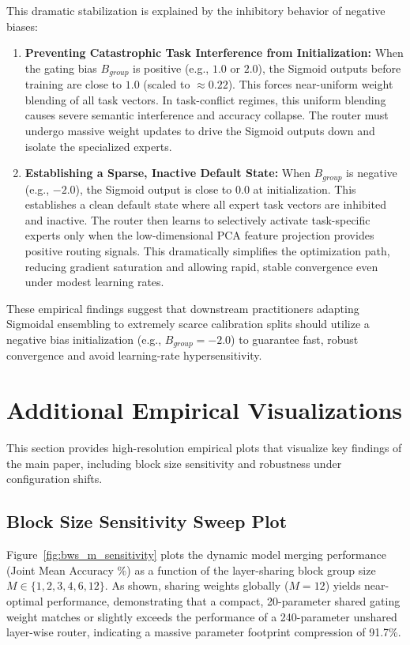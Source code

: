 This dramatic stabilization is explained by the inhibitory behavior of negative biases:
\begin{enumerate}
    \item \textbf{Preventing Catastrophic Task Interference from Initialization:} When the gating bias $B_{group}$ is positive (e.g., $1.0$ or $2.0$), the Sigmoid outputs before training are close to $1.0$ (scaled to $\approx 0.22$). This forces near-uniform weight blending of all task vectors. In task-conflict regimes, this uniform blending causes severe semantic interference and accuracy collapse. The router must undergo massive weight updates to drive the Sigmoid outputs down and isolate the specialized experts. 
    \item \textbf{Establishing a Sparse, Inactive Default State:} When $B_{group}$ is negative (e.g., $-2.0$), the Sigmoid output is close to $0.0$ at initialization. This establishes a clean default state where all expert task vectors are inhibited and inactive. The router then learns to selectively activate task-specific experts only when the low-dimensional PCA feature projection provides positive routing signals. This dramatically simplifies the optimization path, reducing gradient saturation and allowing rapid, stable convergence even under modest learning rates.
\end{enumerate}

These empirical findings suggest that downstream practitioners adapting Sigmoidal ensembling to extremely scarce calibration splits should utilize a negative bias initialization (e.g., $B_{group} = -2.0$) to guarantee fast, robust convergence and avoid learning-rate hypersensitivity.

\section{Additional Empirical Visualizations}
\label{app:additional_plots}
This section provides high-resolution empirical plots that visualize key findings of the main paper, including block size sensitivity and robustness under configuration shifts.

\subsection{Block Size Sensitivity Sweep Plot}
Figure~\ref{fig:bws_m_sensitivity} plots the dynamic model merging performance (Joint Mean Accuracy \%) as a function of the layer-sharing block group size $M \in \{1, 2, 3, 4, 6, 12\}$. As shown, sharing weights globally ($M=12$) yields near-optimal performance, demonstrating that a compact, 20-parameter shared gating weight matches or slightly exceeds the performance of a 240-parameter unshared layer-wise router, indicating a massive parameter footprint compression of 91.7\%.

